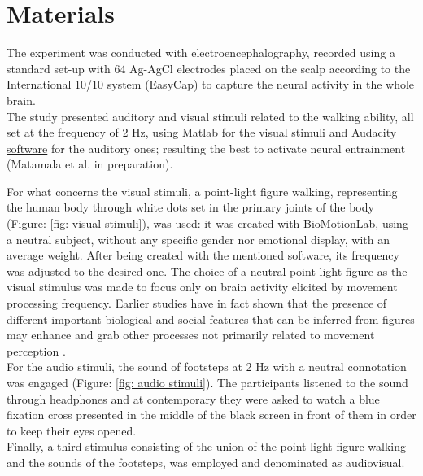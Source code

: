 \section{Materials}
The experiment was conducted with electroencephalography, recorded using a standard set-up with 64 Ag-AgCl electrodes placed on the scalp according to the International 10/10 system (\href{https://www.easycap.de/}{EasyCap}) to capture the neural activity in the whole brain. \\
The study presented auditory and visual stimuli related to the walking ability, all set at the frequency of 2 Hz, using Matlab for the visual stimuli and \href{https://www.audacityteam.org/}{Audacity software} for the auditory ones; resulting the best to activate neural entrainment (Matamala et al. in preparation).

For what concerns the visual stimuli, a point-light figure walking, representing the human body through white dots set in the primary joints of the body (Figure: \ref{fig: visual stimuli}), was used: it was created with \href{https://www.biomotionlab.ca/html5-bml-walker/}{BioMotionLab}, using a neutral subject, without any specific gender nor emotional display, with an average weight. After being created with the mentioned software, its frequency was adjusted to the desired one. The choice of a neutral point-light figure as the visual stimulus was made to focus only on brain activity elicited by movement processing frequency. Earlier studies have in fact shown that the presence of different important biological and social features that can be inferred from figures may enhance and grab other processes not primarily related to movement perception \parencite{Cracco_2022}. \\
For the audio stimuli, the sound of footsteps at 2 Hz with a neutral connotation was engaged (Figure: \ref{fig: audio stimuli}). The participants listened to the sound through headphones and at contemporary they were asked to watch a blue fixation cross presented in the middle of the black screen in front of them in order to keep their eyes opened. \\
Finally, a third stimulus consisting of the union of the point-light figure walking and the sounds of the footsteps, was employed and denominated as audiovisual. 
